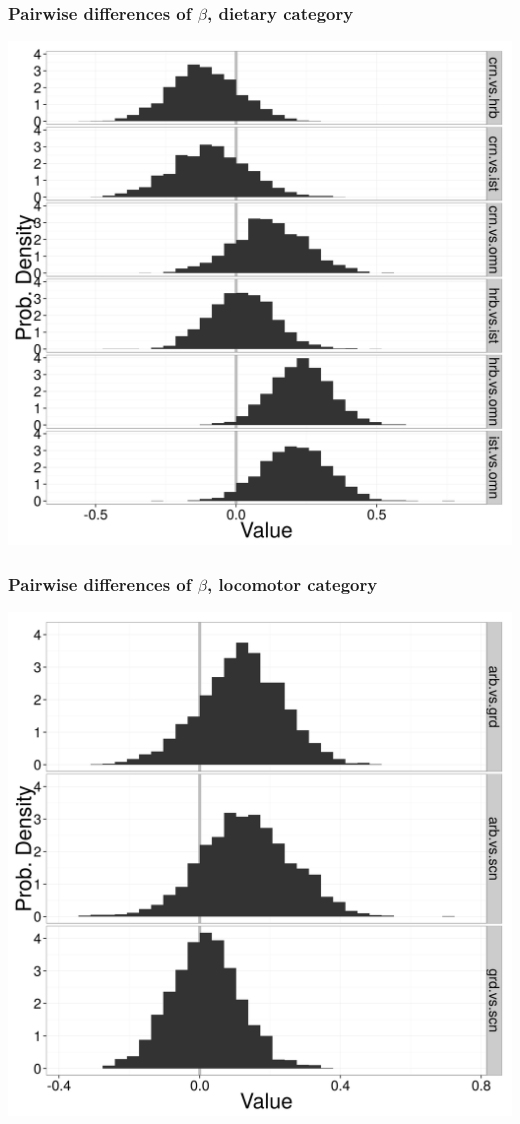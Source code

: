 \documentclass{beamer}
\begin{document}
\begin{frame}
  \frametitle{Pairwise differences of \(\beta\), dietary category}
  \begin{center}
    \includegraphics[height = 0.8\textheight, width = \textwidth,  keepaspectratio = true]{figure/diet_diff_est}
  \end{center}
\end{frame}

\begin{frame}
  \frametitle{Pairwise differences of \(\beta\), locomotor category}
  \begin{center}
    \includegraphics[height = 0.8\textheight, width = \textwidth,  keepaspectratio = true]{figure/loco_diff_est}
  \end{center}
\end{frame}
\end{document}
